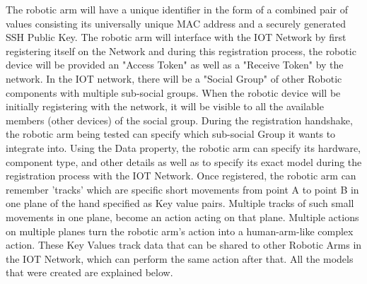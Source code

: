 \documentclass[conference]{IEEEtran}
\begin{document}
 
The robotic arm will have a unique identifier in the form of a combined pair of values consisting its universally unique MAC address and a securely generated SSH Public Key. The robotic arm will interface with the IOT Network by first registering itself on the Network and during this registration process, the robotic device will be provided an "Access Token" as well as a "Receive Token" by the network. In the IOT network, there will be a "Social Group" of other Robotic components with multiple sub-social groups. When the robotic device will be initially registering with the network, it will be visible to all the available members (other devices) of the social group. During the registration handshake, the robotic arm being tested can specify which sub-social Group it wants to integrate into. Using the Data property, the robotic arm can specify its hardware, component type, and other details as well as to specify its exact model during the registration process with the IOT Network. Once registered, the robotic arm can remember 'tracks' which are specific short movements from point A to point B in one plane of the hand specified as Key value pairs. Multiple tracks of such small movements in one plane, become an action acting on that plane. Multiple actions on multiple planes turn the robotic arm's action into a human-arm-like complex action. These Key Values track data that can be shared to other Robotic Arms in the IOT Network, which can perform the same action after that. All the models that were created are explained below.
\end{document}
